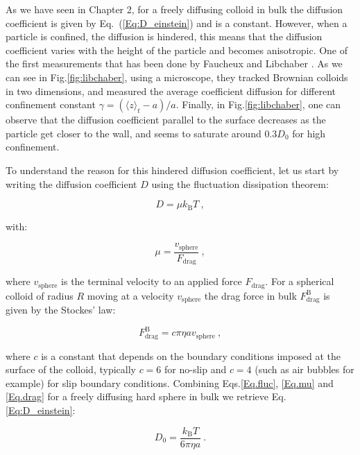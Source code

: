 As we have seen in Chapter 2, for a freely diffusing colloid in bulk the diffusion coefficient is given by Eq.~(\ref{Eq:D_einstein}) and is a constant. However, when a particle is confined, the diffusion is hindered, this means that the diffusion coefficient varies with the height of the particle and becomes anisotropic. One of the first measurements that has been done by Faucheux and Libchaber \cite{faucheux_confined_1994}. As we can see in Fig.\ref{fig:libchaber}, using a microscope, they tracked Brownian colloids in two dimensions, and measured the average coefficient diffusion for different confinement constant $\gamma = (\langle z\rangle_t - a) / a$. Finally, in Fig.\ref{fig:libchaber}, one can observe that the diffusion coefficient parallel to the surface decreases as the particle get closer to the wall, and seems to saturate around $0.3D_0$ for high confinement. 
\newpage

To understand the reason for this hindered diffusion coefficient, let us start by writing the diffusion coefficient $D$ using the fluctuation dissipation theorem:

\begin{equation}
	D = \mu k_\mathrm{B}T ~,
	\label{Eq.fluc}
\end{equation}

with:

\begin{equation}
	\mu = \frac{v_\mathrm{sphere}}{F_\mathrm{drag}} ~,
	\label{Eq.mu}
\end{equation}

where $v_\mathrm{sphere}$ is the terminal velocity to an applied force $F_\mathrm{drag}$. For a spherical colloid of radius $R$ moving at a velocity $v_\mathrm{sphere}$ the drag force in bulk $F_{\mathrm{drag}} ^\mathrm{B}$ is given by the Stockes' law:

\begin{equation}
	F_\mathrm{drag} ^\mathrm{B} = c \pi \eta a v_\mathrm{sphere} ~,
	\label{Eq.drag}
\end{equation}

where $c$ is a constant that depends on the boundary conditions imposed at the surface of the colloid, typically $c = 6$ for no-slip  and $c = 4$ (such as air bubbles for example) for slip boundary conditions. Combining Eqs.\ref{Eq.fluc}, \ref{Eq.mu} and \ref{Eq.drag} for a freely diffusing hard sphere in bulk we retrieve Eq.\ref{Eq:D_einstein}: 

\begin{equation}
	D_0 = \frac{k_\mathrm{B}T}{6\pi \eta a} ~.
	\label{Eq.D}
\end{equation}

